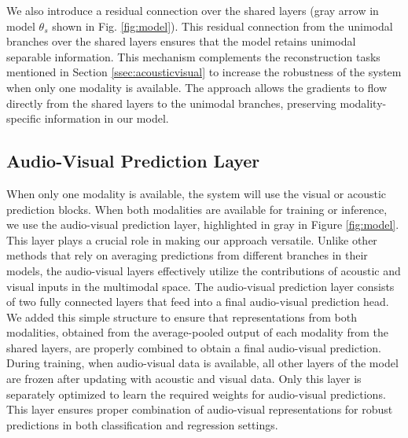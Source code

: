 \documentclass{article}
\begin{document}
We also introduce a residual connection over the shared layers (gray arrow in model $\theta_s$ shown in Fig. \ref{fig:model}). This residual connection from the unimodal branches over the shared layers ensures that the model retains unimodal separable information. This mechanism complements the reconstruction tasks mentioned in Section \ref{ssec:acousticvisual} to increase the robustness of the system when only one modality is available. The approach allows the gradients to flow directly from the shared layers to the unimodal branches, preserving modality-specific information in our model.

\subsection{Audio-Visual Prediction Layer}
\label{ssec:AudiovisualModel}

When only one modality is available, the system will use the visual or acoustic prediction blocks. When both modalities are available for training or inference, we use the audio-visual prediction layer, highlighted in gray in Figure \ref{fig:model}. This layer plays a crucial role in making our approach versatile. Unlike other methods that rely on averaging predictions from different branches in their models, the audio-visual layers effectively utilize the contributions of acoustic and visual inputs in the multimodal space. The audio-visual prediction layer consists of two fully connected layers that feed into a final audio-visual prediction head. We added this simple structure to ensure that representations from both modalities, obtained from the average-pooled output of each modality from the shared layers, are properly combined to obtain a final audio-visual prediction. During training, when audio-visual data is available, all other layers of the model are frozen after updating with acoustic and visual data. Only this layer is separately optimized to learn the required weights for audio-visual predictions. This layer ensures proper combination of audio-visual representations for robust predictions in both classification and regression settings.
\end{document}
